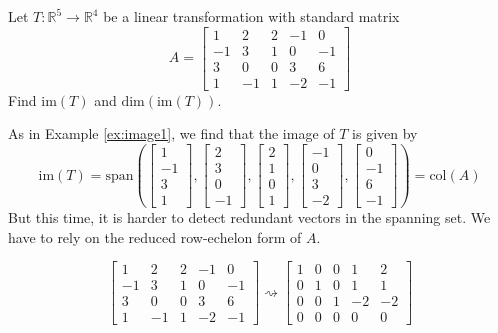 \documentclass{ximera}
\newcommand{\RR}{\mathbb{R}}
\begin{document}
\begin{example}\label{ex:image2}
Let $T:\RR^5\rightarrow \RR^4$ be a linear transformation with standard matrix $$A=\begin{bmatrix}1 & 2 & 2 &-1 & 0\\-1 & 3 & 1 & 0 & -1\\3 & 0 & 0 & 3 & 6\\ 1 & -1 & 1 & -2 & -1\end{bmatrix}$$
Find $\text{im}(T)$ and $\text{dim}(\text{im}(T))$.
\begin{explanation}
As in Example \ref{ex:image1}, we find that the image of $T$ is given by
$$\text{im}(T)=\text{span}\left(\begin{bmatrix}1\\-1\\3\\1\end{bmatrix}, \begin{bmatrix}2\\3\\0\\-1\end{bmatrix}, \begin{bmatrix}2\\1\\0\\1\end{bmatrix}, \begin{bmatrix}-1\\0\\3\\-2\end{bmatrix}, \begin{bmatrix}0\\-1\\6\\-1\end{bmatrix}\right)=\text{col}(A)$$
But this time, it is harder to detect redundant vectors in the spanning set.  We have to rely on the reduced row-echelon form of $A$.

$$\begin{bmatrix}1 & 2 & 2 &-1 & 0\\-1 & 3 & 1 & 0 & -1\\3 & 0 & 0 & 3 & 6\\ 1 & -1 & 1 & -2 & -1\end{bmatrix}  \rightsquigarrow \begin{bmatrix} 1 & 0 & 0 & 1 & 2\\0 & 1 & 0 & 1 & 1\\0 & 0 & 1 & -2 & -2\\ 0 & 0 & 0 & 0 & 0 \end{bmatrix}$$


\end{explanation}
\end{example}
\end{document}
